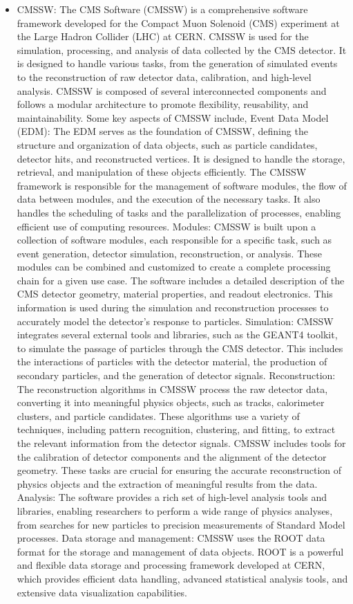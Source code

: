 \begin{itemize}

\item CMSSW: The CMS Software (CMSSW) is a comprehensive software framework developed for the Compact Muon Solenoid (CMS) experiment at the Large Hadron Collider (LHC) at CERN. CMSSW is used for the simulation, processing, and analysis of data collected by the CMS detector. It is designed to handle various tasks, from the generation of simulated events to the reconstruction of raw detector data, calibration, and high-level analysis. CMSSW is composed of several interconnected components and follows a modular architecture to promote flexibility, reusability, and maintainability. Some key aspects of CMSSW include, Event Data Model (EDM): The EDM serves as the foundation of CMSSW, defining the structure and organization of data objects, such as particle candidates, detector hits, and reconstructed vertices. It is designed to handle the storage, retrieval, and manipulation of these objects efficiently. The CMSSW framework is responsible for the management of software modules, the flow of data between modules, and the execution of the necessary tasks. It also handles the scheduling of tasks and the parallelization of processes, enabling efficient use of computing resources. Modules: CMSSW is built upon a collection of software modules, each responsible for a specific task, such as event generation, detector simulation, reconstruction, or analysis. These modules can be combined and customized to create a complete processing chain for a given use case. The software includes a detailed description of the CMS detector geometry, material properties, and readout electronics. This information is used during the simulation and reconstruction processes to accurately model the detector's response to particles. 
Simulation: CMSSW integrates several external tools and libraries, such as the GEANT4 toolkit, to simulate the passage of particles through the CMS detector. This includes the interactions of particles with the detector material, the production of secondary particles, and the generation of detector signals. Reconstruction: The reconstruction algorithms in CMSSW process the raw detector data, converting it into meaningful physics objects, such as tracks, calorimeter clusters, and particle candidates. These algorithms use a variety of techniques, including pattern recognition, clustering, and fitting, to extract the relevant information from the detector signals. CMSSW includes tools for the calibration of detector components and the alignment of the detector geometry. These tasks are crucial for ensuring the accurate reconstruction of physics objects and the extraction of meaningful results from the data. Analysis: The software provides a rich set of high-level analysis tools and libraries, enabling researchers to perform a wide range of physics analyses, from searches for new particles to precision measurements of Standard Model processes. Data storage and management: CMSSW uses the ROOT data format for the storage and management of data objects. ROOT is a powerful and flexible data storage and processing framework developed at CERN, which provides efficient data handling, advanced statistical analysis tools, and extensive data visualization capabilities.


\end{itemize}
